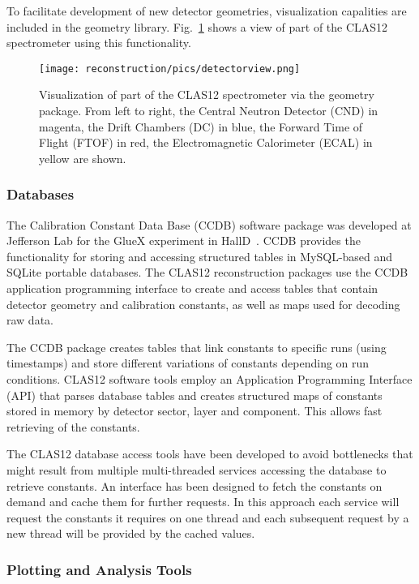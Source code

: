 To facilitate development of new detector geometries, visualization capalities are included in the geometry library. Fig.~\ref{fig:detectorview} shows a view of part of the CLAS12 spectrometer using this functionality.

\begin{figure}
\centering
\texttt{[image: reconstruction/pics/detectorview.png]}
\caption{Visualization of part of the CLAS12 spectrometer via the geometry package. From left to right, the Central Neutron Detector (CND) in magenta, the Drift Chambers (DC) in blue, the Forward Time of Flight (FTOF) in red, the Electromagnetic Calorimeter (ECAL) in yellow are shown.}
\label{fig:detectorview}
\end{figure}
\subsubsection{Databases}

The Calibration Constant Data Base (CCDB) software package was developed at Jefferson Lab for the GlueX experiment
in HallD~\cite{gluex}.  CCDB provides the functionality for storing and accessing structured tables in MySQL-based and SQLite portable databases.
The CLAS12 reconstruction packages use the CCDB application programming interface to create and access
tables that contain detector geometry and calibration constants, as well as maps used for decoding raw data.

The CCDB package creates
tables that link constants to specific runs (using timestamps) and store different variations of constants depending on run
conditions. CLAS12 software tools employ an Application Programming Interface (API) that parses database tables and creates
structured maps of constants stored in  memory by detector sector, layer and component. This allows fast retrieving of the
constants.

The CLAS12 database access tools have been developed to avoid bottlenecks that might result from multiple multi-threaded
services accessing the database to retrieve constants.  An interface has been designed to fetch the constants
on demand and cache them for further requests. In this approach each service will request the
constants it requires on one thread and each subsequent request by a new thread will be provided by the cached values.

\subsubsection{Plotting and Analysis Tools}

